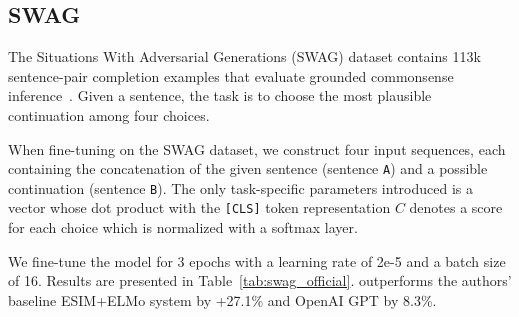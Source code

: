 \subsection{SWAG}
\label{sec:swag}
The Situations With Adversarial Generations (SWAG) dataset contains 113k sentence-pair completion examples that evaluate grounded commonsense inference~\cite{zellers2018swag}. Given a sentence, the task is to choose the most plausible continuation among four choices.


When fine-tuning on the SWAG dataset, we construct four input sequences, each containing the concatenation of the given sentence (sentence {\tt A}) and a possible continuation (sentence {\tt B}). The only task-specific parameters introduced is a vector whose dot product with the {\tt [CLS]} token representation $C$ denotes a score for each choice which is normalized with a softmax layer.

We fine-tune the model for 3 epochs with a learning rate of 2e-5 and a batch size of 16. Results are presented in Table~\ref{tab:swag_official}. \bertlarge outperforms the authors' baseline ESIM+ELMo system by +27.1\% and OpenAI GPT by 8.3\%.


